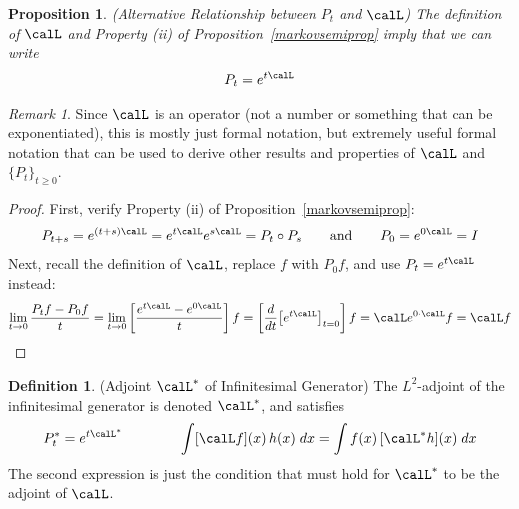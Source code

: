 \documentclass[12pt]{article}
\theoremstyle{plain}
\newtheorem{prop}[thm]{Proposition}
\theoremstyle{definition}
\newtheorem{defn}[thm]{Definition}
\theoremstyle{remark}
\newtheorem*{rmk}{Remark}
\newcommand{\ra}{\rightarrow}
\begin{document}
\begin{prop}\emph{(Alternative Relationship between $P_t$ and $\calL$)}
\label{PtcalL}
The definition of $\calL$ and Property (ii) of
Proposition~\ref{markovsemiprop} imply that we can write
\begin{align*}
  P_t = e^{t\calL}
\end{align*}
\end{prop}
\begin{rmk}
Since $\calL$ is an operator (not a number or something that can be
exponentiated), this is mostly just formal notation, but extremely
useful formal notation that can be used to derive other results and
properties of $\calL$ and $\{P_t\}_{t\geq 0}$.
\end{rmk}
\begin{proof}
First, verify Property (ii) of Proposition~\ref{markovsemiprop}:
\begin{align*}
  P_{t+s}
  =
  e^{(t+s)\calL}
  =
  e^{t\calL}
  e^{s\calL}
  =
  P_t\circ P_s
  \qquad\text{and}\qquad
  P_0
  = e^{0\calL} = I
\end{align*}
Next, recall the definition of $\calL$, replace $f$ with $P_0f$, and use
$P_t=e^{t\calL}$ instead:
\begin{align*}
  \lim_{t\ra 0}
  \frac{P_tf-P_0f}{t}
  =
  \lim_{t\ra 0}
  \left[
  \frac{e^{t\calL}-e^{0\calL}}{t}
  \right]
  f
  =
  \left[
  \frac{d}{dt}\big[e^{t\calL}\big]_{t=0}
  \right]
  f
  =
  \calL e^{0\cdot \calL}
  f
  = \calL f
\end{align*}
\end{proof}

\begin{defn}(Adjoint $\calL^*$ of Infinitesimal Generator)
The $L^2$-adjoint of the infinitesimal generator is denoted $\calL^*$,
and satisfies
\begin{align*}
  P_t^*
  =
  e^{t\calL^*}
  \qquad
  \qquad
  \int [\calL f](x)\,h(x)\;dx
  =
  \int f(x)\,[\calL^* h](x)\;dx
\end{align*}
The second expression is just the condition that must hold for $\calL^*$
to be the adjoint of $\calL$.
\end{defn}
\end{document}
